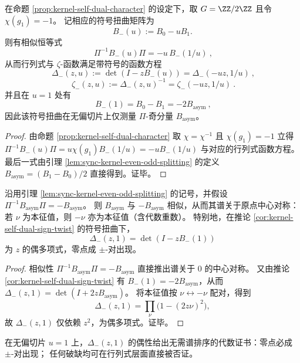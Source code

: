 \begin{corollary}[符号扭曲 \texorpdfstring{$\chi(g_1)=-1$}{chi(g1)=-1} 的自对偶函数方程与 \texorpdfstring{$u=1$}{u=1} 的“纯奇部”读出]\label{cor:kernel-self-dual-sign-twist}
在命题 \ref{prop:kernel-self-dual-character} 的设定下，取 \(G=\ZZ/2\ZZ\) 且令 \(\chi(g_1)=-1\)。
记相应的符号扭曲矩阵为
\[
B_{-}(u):=B_0-uB_1.
\]
则有相似恒等式
\[
\boxed{\ \Pi^{-1}B_{-}(u)\Pi=-u\,B_{-}(1/u)\ },
\]
从而行列式与 \(\zeta\)-函数满足带符号的函数方程
\[
\boxed{\ \Delta_{-}(z,u):=\det(I-zB_{-}(u))=\Delta_{-}(-uz,1/u)\ },
\]
\[
\boxed{\ \zeta_{-}(z,u):=\Delta_{-}(z,u)^{-1}=\zeta_{-}(-uz,1/u)\ }.
\]
并且在 \(u=1\) 处有
\[
\boxed{\ B_{-}(1)=B_0-B_1=-2B_{\mathrm{asym}}\ },
\]
因此该符号扭曲在无偏切片上仅测量 \(\Pi\)-奇分量 \(B_{\mathrm{asym}}\)。
\end{corollary}

\begin{proof}
由命题 \ref{prop:kernel-self-dual-character} 取 \(\chi=\chi^{-1}\) 且 \(\chi(g_1)=-1\) 立得
\(
\Pi^{-1}B_{-}(u)\Pi=u\chi(g_1)B_{-}(1/u)=-uB_{-}(1/u)
\)
与对应的行列式函数方程。
最后一式由引理 \ref{lem:sync-kernel-even-odd-splitting} 的定义 \(B_{\mathrm{asym}}=(B_1-B_0)/2\) 直接得到。证毕。
\end{proof}

\begin{proposition}\label{prop:pi-odd-central-spectrum}
沿用引理 \ref{lem:sync-kernel-even-odd-splitting} 的记号，并假设
\(\Pi^{-1}B_{\mathrm{asym}}\Pi=-B_{\mathrm{asym}}\)。
则 \(B_{\mathrm{asym}}\) 与 \(-B_{\mathrm{asym}}\) 相似，从而其谱关于原点中心对称：若 \(\nu\) 为本征值，则 \(-\nu\) 亦为本征值（含代数重数）。
特别地，在推论 \ref{cor:kernel-self-dual-sign-twist} 的符号扭曲下，
\[
\Delta_{-}(z,1)=\det(I-zB_{-}(1))
\]
为 \(z\) 的偶多项式，零点成 \(\pm\)-对出现。
\end{proposition}
\begin{proof}
相似性 \(\Pi^{-1}B_{\mathrm{asym}}\Pi=-B_{\mathrm{asym}}\) 直接推出谱关于 \(0\) 的中心对称。
又由推论 \ref{cor:kernel-self-dual-sign-twist} 有 \(B_{-}(1)=-2B_{\mathrm{asym}}\)，从而
\(\Delta_{-}(z,1)=\det(I+2zB_{\mathrm{asym}})\)。
将本征值按 \(\nu\leftrightarrow -\nu\) 配对，得到
\[
\Delta_{-}(z,1)=\prod_{\nu}\bigl(1-(2z\nu)^2\bigr),
\]
故 \(\Delta_{-}(z,1)\) 仅依赖 \(z^2\)，为偶多项式。证毕。
\end{proof}

\begin{remark}[偶行列式作为谱审计证书]\label{rem:pi-odd-even-determinant-certificate}
在无偏切片 \(u=1\) 上，\(\Delta_{-}(z,1)\) 的偶性给出无需谱排序的代数证书：零点必成 \(\pm\)-对出现；
任何破缺均可在行列式层面直接被否证。
\end{remark}


